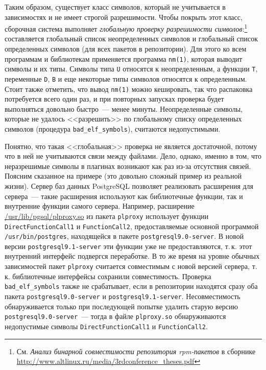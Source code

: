 \documentclass[russian,a4paper,12pt,titlepage]{article}
\begin{document}
Таким образом, существует класс символов, который не учитывается в зависимостях и не имеет строгой разрешимости.
Чтобы покрыть этот класс, сборочная система выполняет \emph{глобальную проверку разрешимости символов}:\footnote{См.
\textsl{Анализ бинарной совместимости репозитория rpm-пакетов} в сборнике \url{http://www.altlinux.ru/media/3rdconference_theses.pdf}}
составляется глобальный список неопределенных символов и глобальный список определенных символов (для всех пакетов в репозитории).
Для этого ко всем программам и библиотекам применяется программа \verb|nm(1)|, которая выводит символы и их типы.
Символы типа \verb|U| относятся к неопределенным, а функции \verb|T|, переменные \verb|D|, \verb|B|
и еще некоторые типы символов относятся к определенным.  Стоит также отметить, что вывод \verb|nm(1)| можно кешировать,
так что распаковка потребуется всего один раз, и при повторных запусках проверка будет выполняться довольно быстро~--- менее минуты.
Неопределенные символы, которые не удалось <<разрешить>> по глобальному списку определенных символов
(процедура \verb|bad_elf_symbols|), считаются недопустимыми.

Понятно, что такая <<глобальная>> проверка не является достаточной, потому что в ней не учитываются связи между файлами.
Дело, однако, именно в том, что неразрешимые символы в плагинах возникают как раз из-за отсутствия связей.
Поясним сказанное на примере (это довольно сложный пример из реальной жизни).  Сервер баз данных PostgreSQL позволяет
реализовать расширения для сервера~--- такие расширения используют как библиотечные функции, так и внутренние
функции самого сервера.  Например, расширение \url{/usr/lib/pgsql/plproxy.so} из пакета \verb|plproxy|
использует функции \verb|DirectFunctionCall1| и \verb|FunctionCall2|, предоставляемые основной программой
\verb|/usr/bin/postgres|, находящейся в пакете \verb|postgresql9.0-server|.  В новой версии \verb|postgresql9.1-server|
эти функции уже не предоставляются, т.\,к. этот внутренний интерфейс подвергся переработке.  В то же время на уровне обычных
зависимостей пакет \verb|plproxy| считается совместимым с новой версией сервера, т.\,к. библиотечные интерфейсы сохранили совместимость.
Проверка \verb|bad_elf_symbols| также не срабатывает, если в репозитории находятся сразу оба пакета \verb|postgresql9.0-server|
и \verb|postgresql9.1-server|.  Несовместимость обнаруживается только при последующей попытке удалить старую версию
\verb|postgresql9.0-server|~--- тогда в файле \verb|plproxy.so| обнаруживаются недопустимые символы \verb|DirectFunctionCall1| и \verb|FunctionCall2|.
\end{document}
